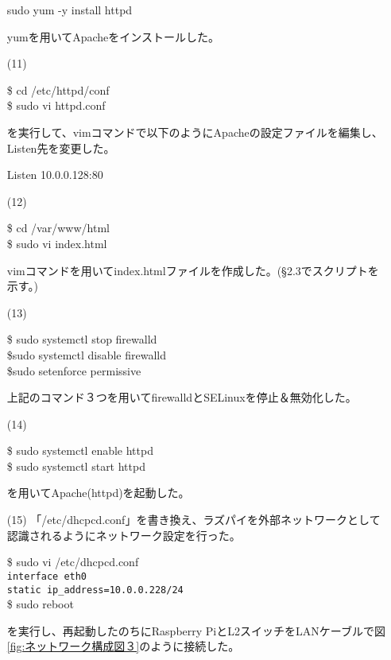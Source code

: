 \documentclass[12pt,a4paper]{jsarticle}
\numberwithin{equation}{section}
\numberwithin{figure}{section}
\numberwithin{table}{section}
\begin{document}
\begin{itemize}
      \begin{screen}
        sudo yum -y install httpd
      \end{screen}
      yumを用いてApacheをインストールした。
      \item [(11)]\quad
      \begin{screen}
        \$ cd /etc/httpd/conf\\
        \$ sudo vi httpd.conf
      \end{screen}
      を実行して、vimコマンドで以下のようにApacheの設定ファイルを編集し、Listen先を変更した。
      \begin{screen}
        Listen 10.0.0.128:80
      \end{screen}
      \item [(12)]\quad
      \begin{screen}
        \$ cd /var/www/html\\
        \$ sudo vi index.html  
      \end{screen}
      vimコマンドを用いてindex.htmlファイルを作成した。(§2.3でスクリプトを示す。)
      \item [(13)]\quad
      \begin{screen}
        \$ sudo systemctl stop firewalld\\
        \$sudo systemctl disable firewalld\\
        \$sudo setenforce permissive
      \end{screen}
      上記のコマンド３つを用いてfirewalldとSELinuxを停止＆無効化した。
      \item [(14)]\quad
      \begin{screen}
        \$ sudo systemctl enable httpd\\
        \$ sudo systemctl start httpd
      \end{screen}
      を用いてApache(httpd)を起動した。
      \item [(15)]「/etc/dhcpcd.conf」を書き換え、ラズパイを外部ネットワークとして認識されるようにネットワーク設定を行った。
      \begin{screen}
        \$ sudo vi /etc/dhcpcd.conf\\
        \verb|interface eth0|\\
        \verb|static ip_address=10.0.0.228/24|\\
        \$ sudo reboot
      \end{screen}
      を実行し、再起動したのちにRaspberry PiとL2スイッチをLANケーブルで図\ref{fig:ネットワーク構成図３}のように接続した。
      

\end{itemize}
\end{document}
